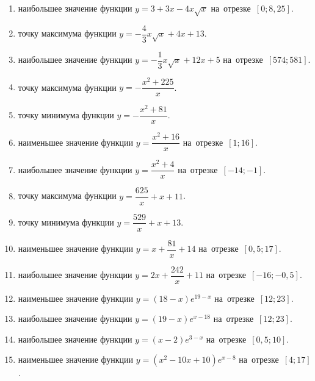 \documentclass[a4paper,10pt]{article}
\begin{document}
\begin{enumerate}
\item {} наибольшее значение функции $y=3+3x -4x\sqrt{x}$ на~отрезке~$\left[0;8,25\right]$.

\item {} точку максимума функции $y=-\dfrac{4}{3}x\sqrt{x} +4x+13$.

\item {} наибольшее значение функции $y=-\dfrac{1}{3}x\sqrt{x} +12x+5$ на~отрезке~$\left[574;581\right]$.

\item {} точку максимума функции $y=-\dfrac{x^2 +225}{x}$.

\item {} точку минимума функции $y=-\dfrac{x^2 +81}{x}$.

\item {} наименьшее значение функции $y=\dfrac{x^2 +16}{x}$ на~отрезке~$\left[1;16\right]$.

\item {} наибольшее значение функции $y=\dfrac{x^2 +4}{x}$ на~отрезке~$\left[-14;-1\right]$.

\item {} точку максимума функции $y=\dfrac{625}{x} +x+11$.

\item {} точку минимума функции $y=\dfrac{529}{x} +x+13$.

\item {} наименьшее значение функции $y=x+\dfrac{81}{x} +14$ на~отрезке~$\left[0,5;17\right]$.

\item {} наибольшее значение функции $y=2x+\dfrac{242}{x} +11$ на~отрезке~$\left[-16;-0,5\right]$.

\item {} наименьшее значение функции $y=\left(18-x\right)e^{19-x}$ на~отрезке~$\left[12;23\right]$.

\item {} наибольшее значение функции $y=\left(19-x\right)e^{x-18}$ на~отрезке~$\left[12;23\right]$.

\item {} наибольшее значение функции $y=\left(x-2\right)e^{3-x}$ на~отрезке~$\left[0,5;10\right]$.

\item {} наименьшее значение функции $y=\left(x^2 -10x +10\right)e^{x -8}$ на~отрезке~$\left[4;17\right]$.


\end{enumerate}
\end{document}

